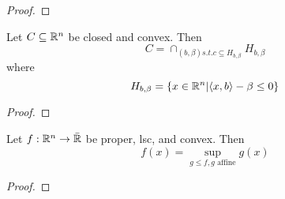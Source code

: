 \begin{proof}
\end{proof}

\begin{thm}
  \label{defn:conjugate_functions:3}
  Let $C \subseteq \mathbb{R}^{n}$ be closed and convex.  Then
  \begin{equation}
    \label{eq:50}
    C = \cap_{(b, \beta) s.t. c \subseteq H_{b, \beta}} H_{b, \beta}
  \end{equation} where
  \begin{equation}
    \label{eq:51}
    H_{b, \beta} = \{ x \in \mathbb{R}^{n} | \langle x, b \rangle - \beta
    \leq 0 \}
  \end{equation}
\end{thm}

\begin{proof}
  \todo{}
\end{proof}

\begin{thm}
  \label{defn:conjugate_functions:4}
  Let $f: \mathbb{R}^{n} \rightarrow \bar {\mathbb{R}}$ be proper, lsc, and convex.
  Then
  \begin{equation}
    \label{eq:52}
    f(x) = \sup_{g \leq f, \text{$g$ affine}} g(x)
  \end{equation}
\end{thm}

\begin{proof}
\end{proof}


